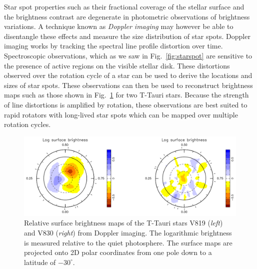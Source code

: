 Star spot properties such as their fractional coverage of the stellar surface and the 
brightness contrast are degenerate in photometric observations of 
brightness variations. A technique known as \emph{Doppler imaging} \parencite{vogt83} 
may however be able to disentangle 
these effects and measure the size distribution of star spots. 
Doppler imaging works by tracking the spectral line profile distortion over time. 
Spectroscopic observations, which as we saw in Fig.~\ref{fig:starspot} 
are sensitive to the presence 
of active regions on the visible stellar disk. These distortions observed 
over the rotation cycle of a 
star can be used to derive the locations and sizes of star spots. These observations 
can then be used to reconstruct brightness maps such as those shown in 
Fig.~\ref{fig:brightnessmap} for two T-Tauri stars. Because the strength of line 
distortions is amplified by rotation, these observations are best suited to rapid 
rotators with long-lived star spots which can be mapped over multiple rotation cycles. \\

\begin{figure}
\centering
\includegraphics[scale=.4]{figures/surfacemap.png}
\caption{Relative surface brightness maps of the T-Tauri stars V819 (\emph{left}) and V830 
(\emph{right}) from Doppler imaging. 
The logarithmic brightness is measured relative to the quiet photosphere. 
The surface maps are projected onto 2D polar coordinates from one pole down to a latitude 
of $-30^{\circ}$. \parencite[Image credit:][]{donati15} \label{fig:brightnessmap}}
\end{figure}

